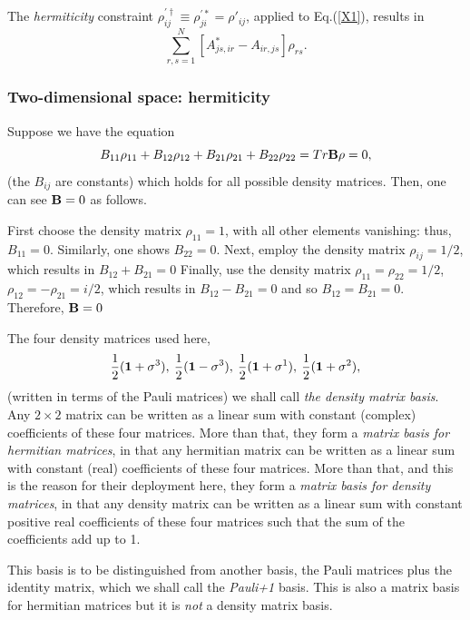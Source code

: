 \documentclass[aps,pra,amssymb, amsfonts,amsmath,showpacs, superscriptaddress,12pt]{revtex4}
\begin{document}
The \textit{hermiticity} constraint $\rho_{ij}^{'\dagger}\equiv\rho_{ji}^{'*}=\rho'_{ij}$, applied to  Eq.(\ref{X1}),  results in 
\begin{equation}\label{X2}
\sum_{r,s=1}^{N}[A_{js,ir}^{*}-A_{ir,js}]\rho_{rs}.
\end{equation}

\subsubsection{Two-dimensional space: hermiticity}

Suppose we have the equation
\[
B_{11}\rho_{11}+B_{12}\rho_{12}+B_{21}\rho_{21}+B_{22}\rho_{22}=Tr{\bf B}{\bf \rho}=0,
\] 
\noindent (the $B_{ij}$ are constants) which holds for all possible density matrices.  Then, one can see ${\bf B}=0$  as follows. 

First choose 
the density matrix $\rho_{11}=1$, with all other elements vanishing: thus,  $B_{11}=0$.  Similarly, one shows $B_{22}=0$. Next, employ the density matrix
$ \rho_{ij}=1/2$, which results in $B_{12}+B_{21}=0$  Finally, use the density matrix $\rho_{11}=\rho_{22}=1/2$, $\rho_{12}=-\rho_{21}=i/2$, which results in 
$B_{12}-B_{21}=0$ and so $B_{12}=B_{21}=0$. Therefore, ${\bf B}=0$

The four density matrices used here, 
\[
\frac{1}{2}({\bf 1}+ {\bf \sigma}^{3}), \medspace \frac{1}{2}({\bf 1}- {\bf \sigma}^{3}), \medspace \frac{1}{2}({\bf 1}+{\bf \sigma}^{1}),\medspace \frac{1}{2}({\bf 1}+{\bf \sigma}^{2}),
\]
\noindent (written in terms of the Pauli matrices)
we shall call \textit{the density matrix basis}.   Any $2\times2$ matrix can be written as a linear sum with constant (complex) coefficients of these four matrices. 
                               More than that, they form a \textit{matrix basis for hermitian matrices}, in that any hermitian matrix can be written as a linear sum with constant (real) coefficients of these four matrices. More than that, and this is the reason for their deployment here, they form a \textit{matrix basis for density matrices}, in that any density matrix can be written as a linear sum with constant positive real coefficients of these four matrices such that the sum of the coefficients add up to 1.  
                               
                               This basis is to be distinguished from another basis,  the Pauli matrices plus the identity matrix, which we shall call the \textit{Pauli+1} basis. This is also a matrix basis for hermitian matrices but it is \textit{not}   a density matrix basis. 
\end{document}
